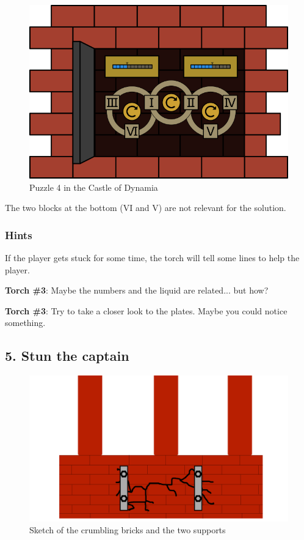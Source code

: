 \begin{figure}[H]
  \centering
  \includegraphics[width=\textwidth]{Images/Puzzles/castleOfDynamia4Solution}
  \caption{Puzzle 4 in the Castle of Dynamia}
\end{figure}

The two blocks at the bottom (VI and V) are not relevant for the solution.

\subsubsection*{Hints}
If the player gets stuck for some time, the torch will tell some lines to help the player.


\textbf{Torch \#{}3}: Maybe the numbers and the liquid are related... but how?

\textbf{Torch \#{}3}: Try to take a closer look to the plates. Maybe you could notice something.


\subsection{5. Stun the captain}

\begin{figure}[H]
  \centering
  \includegraphics[width=\textwidth]{Images/Puzzles/castleOfDynamia5}
  \caption{Sketch of the crumbling bricks and the two supports}
\end{figure}

